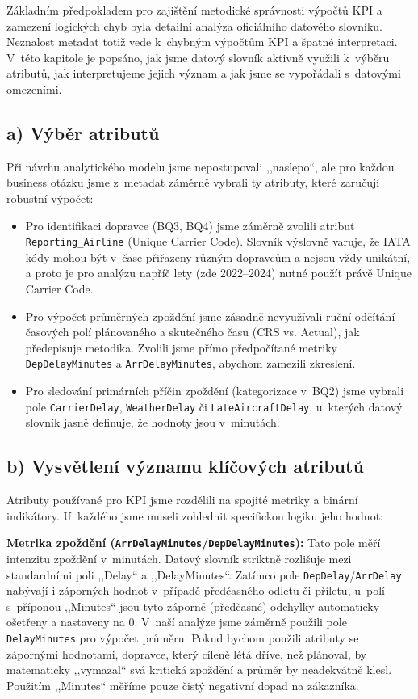 \documentclass{protokol}
\begin{document}
Základním předpokladem pro zajištění metodické správnosti výpočtů KPI a zamezení logických chyb byla detailní analýza oficiálního datového slovníku. Neznalost metadat totiž vede k~chybným výpočtům KPI a špatné interpretaci. V~této kapitole je popsáno, jak jsme datový slovník aktivně využili k~výběru atributů, jak interpretujeme jejich význam a jak jsme se vypořádali s~datovými omezeními.

\subsection{a) Výběr atributů}

Při návrhu analytického modelu jsme nepostupovali ,,naslepo``, ale pro každou business otázku jsme z~metadat záměrně vybrali ty atributy, které zaručují robustní výpočet:

\begin{itemize}
    \item Pro identifikaci dopravce (BQ3, BQ4) jsme záměrně zvolili atribut \texttt{Reporting\_Airline} (Unique Carrier Code). Slovník výslovně varuje, že IATA kódy mohou být v~čase přiřazeny různým dopravcům a nejsou vždy unikátní, a proto je pro analýzu napříč lety (zde 2022--2024) nutné použít právě Unique Carrier Code.

    \item Pro výpočet průměrných zpoždění jsme zásadně nevyužívali ruční odčítání časových polí plánovaného a skutečného času (CRS vs. Actual), jak předepisuje metodika. Zvolili jsme přímo předpočítané metriky \texttt{DepDelayMinutes} a \texttt{ArrDelayMinutes}, abychom zamezili zkreslení.

    \item Pro sledování primárních příčin zpoždění (kategorizace v~BQ2) jsme vybrali pole \texttt{CarrierDelay}, \texttt{WeatherDelay} či \texttt{LateAircraftDelay}, u~kterých datový slovník jasně definuje, že hodnoty jsou v~minutách.
\end{itemize}

\subsection{b) Vysvětlení významu klíčových atributů}

Atributy používané pro KPI jsme rozdělili na spojité metriky a binární indikátory. U~každého jsme museli zohlednit specifickou logiku jeho hodnot:

\textbf{Metrika zpoždění (\texttt{ArrDelayMinutes}/\texttt{DepDelayMinutes}):} Tato pole měří intenzitu zpoždění v~minutách. Datový slovník striktně rozlišuje mezi standardními poli ,,Delay`` a ,,DelayMinutes``. Zatímco pole \texttt{DepDelay}/\texttt{ArrDelay} nabývají i záporných hodnot v~případě předčasného odletu či příletu, u~polí s~příponou ,,Minutes`` jsou tyto záporné (předčasné) odchylky automaticky ošetřeny a nastaveny na 0. V~naší analýze jsme záměrně použili pole \texttt{DelayMinutes} pro výpočet průměru. Pokud bychom použili atributy se zápornými hodnotami, dopravce, který cíleně létá dříve, než plánoval, by matematicky ,,vymazal`` svá kritická zpoždění a průměr by neadekvátně klesl. Použitím ,,Minutes`` měříme pouze čistý negativní dopad na zákazníka.
\end{document}
